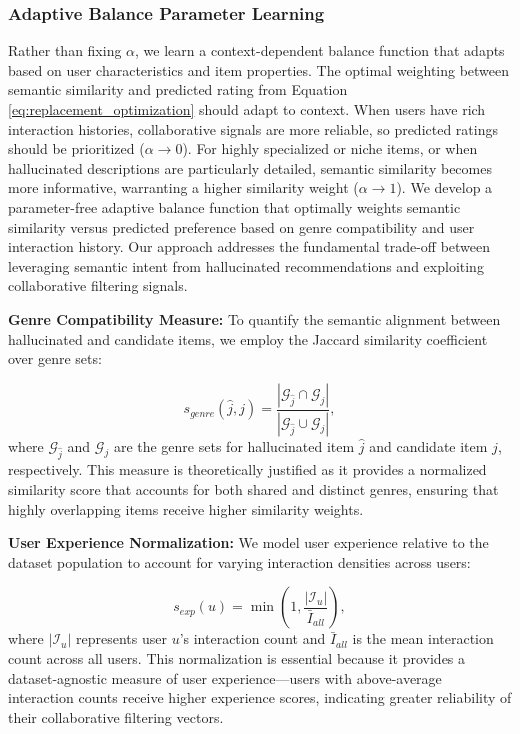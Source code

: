 \documentclass[acmsmall]{acmart}
\begin{document}
\subsubsection{Adaptive Balance Parameter Learning}
\label{adaptive}
Rather than fixing $\alpha$, we learn a context-dependent balance function that adapts based on user characteristics and item properties. The optimal weighting between semantic similarity and predicted rating from Equation \ref{eq:replacement_optimization} should adapt to context. When users have rich interaction histories, collaborative signals are more reliable, so predicted ratings should be prioritized ($\alpha \to 0$). For highly specialized or niche items, or when hallucinated descriptions are particularly detailed, semantic similarity becomes more informative, warranting a higher similarity weight ($\alpha \to 1$).
We develop a parameter-free adaptive balance function that optimally weights semantic similarity versus predicted preference based on genre compatibility and user interaction history. Our approach addresses the fundamental trade-off between leveraging semantic intent from hallucinated recommendations and exploiting collaborative filtering signals.

\textbf{Genre Compatibility Measure:} To quantify the semantic alignment between hallucinated and candidate items, we employ the Jaccard similarity coefficient over genre sets:

\begin{equation}
s_{genre}(\hat{j}, j) = \frac{|\mathcal{G}_{\hat{j}} \cap \mathcal{G}_j|}{|\mathcal{G}_{\hat{j}} \cup \mathcal{G}_j|},
\label{eq:genre_jaccard}
\end{equation}
where $\mathcal{G}_{\hat{j}}$ and $\mathcal{G}_j$ are the genre sets for hallucinated item $\hat{j}$ and candidate item $j$, respectively. This measure is theoretically justified as it provides a normalized similarity score that accounts for both shared and distinct genres, ensuring that highly overlapping items receive higher similarity weights.

\textbf{User Experience Normalization:} We model user experience relative to the dataset population to account for varying interaction densities across users:

\begin{equation}
s_{exp}(u) = \min\left(1, \frac{|\mathcal{I}_u|}{\bar{I}_{all}}\right),
\label{eq:experience_normalization}
\end{equation}
where $|\mathcal{I}_u|$ represents user $u$'s interaction count and $\bar{I}_{all}$ is the mean interaction count across all users. This normalization is essential because it provides a dataset-agnostic measure of user experience—users with above-average interaction counts receive higher experience scores, indicating greater reliability of their collaborative filtering vectors.
\end{document}
